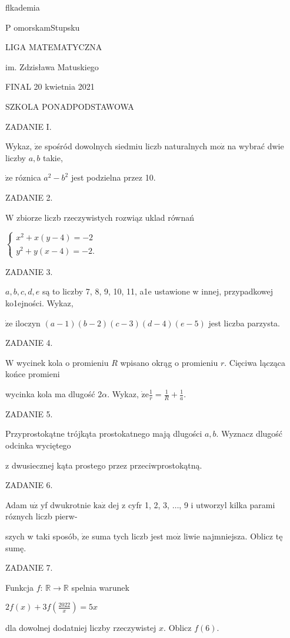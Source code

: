 \documentclass[a4paper,12pt]{article}
\begin{document}
flkademia

P omorskamStupsku

LIGA MATEMATYCZNA

im. Zdzisława Matuskiego

FINAL 20 kwietnia 2021

SZKOLA PONADPODSTAWOWA

ZADANIE I.

Wykaz, $\dot{\mathrm{z}}\mathrm{e}$ spośród dowolnych siedmiu liczb naturalnych $\mathrm{m}\mathrm{o}\dot{\mathrm{z}}$ na wybrać dwie liczby $a, b$ takie,

$\dot{\mathrm{z}}\mathrm{e}$ róznica $a^{2}-b^{2}$ jest podzielna przez 10.

ZADANIE 2.

$\mathrm{W}$ zbiorze liczb rzeczywistych rozwiąz uklad równań

$\left\{\begin{array}{l}
x^{2}+x(y-4)=-2\\
y^{2}+y(x-4)=-2.
\end{array}\right.$

ZADANIE 3.

$a, b, c, d, e$ są to liczby 7, 8, 9, 10, 11, a1e ustawione w innej, przypadkowej ko1ejności. Wykaz,

$\dot{\mathrm{z}}\mathrm{e}$ iloczyn $(a-1)(b-2)(c-3)(d-4)(e-5)$ jest liczba parzysta.

ZADANIE 4.

$\mathrm{W}$ wycinek kola o promieniu $R$ wpisano okrąg o promieniu $r$. Cięciwa lącząca końce promieni

wycinka kola ma dlugość $ 2\alpha$. Wykaz, $\displaystyle \dot{\mathrm{z}}\mathrm{e}\frac{1}{r}=\frac{1}{R}+\frac{1}{a}.$

ZADANIE 5.

Przyprostokątne trójkąta prostokatnego mają dlugości $a, b$. Wyznacz dlugość odcinka wyciętego

z dwusiecznej kąta prostego przez przeciwprostokątną.

ZADANIE 6.

Adam $\mathrm{u}\dot{\mathrm{z}}$ yf dwukrotnie $\mathrm{k}\mathrm{a}\dot{\mathrm{z}}$ dej z cyfr 1, 2, 3, $\ldots$, 9 i utworzyl kilka parami róznych liczb pierw-

szych w taki sposób, $\dot{\mathrm{z}}\mathrm{e}$ suma tych liczb jest $\mathrm{m}\mathrm{o}\dot{\mathrm{z}}$ liwie najmniejsza. Oblicz tę sumę.

ZADANIE 7.

Funkcja $f$: $\mathbb{R}\rightarrow \mathbb{R}$ spelnia warunek

$2f(x)+3f(\displaystyle \frac{2022}{x})=5x$

dla dowolnej dodatniej liczby rzeczywistej $x$. Oblicz $f(6).$
\end{document}
